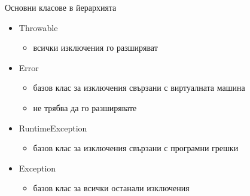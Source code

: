 \documentclass{beamer}
\begin{document}
\begin{frame}{Основни класове в йерархията}
  \transdissolve
  \begin{itemize}
  \item Throwable \pause
    \begin{itemize}
    \item всички изключения го разширяват \pause
    \end{itemize}
  \item Error \pause
    \begin{itemize}
      \item базов клас за изключения свързани с виртуалната машина \pause
      \item не трябва да го разширявате \pause
    \end{itemize}
  \item RuntimeException \pause
    \begin{itemize}
      \item базов клас за изключения свързани с програмни грешки \pause
    \end{itemize}
  \item Exception \pause
    \begin{itemize}
    \item базов клас за всички останали изключения
    \end{itemize}
  \end{itemize}
\end{frame}
\end{document}
